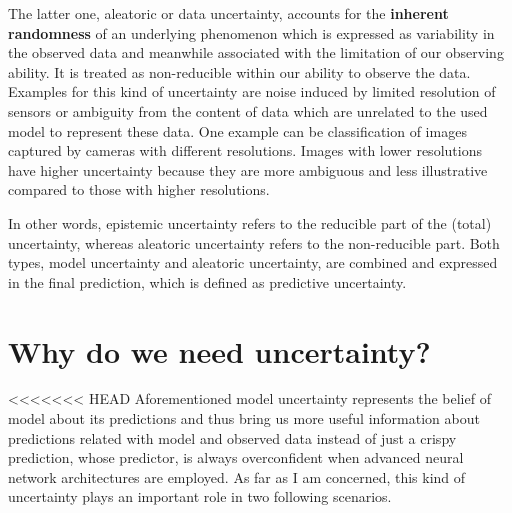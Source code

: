 The latter one, aleatoric or data uncertainty, accounts for the \textbf{inherent randomness} of an underlying phenomenon which is expressed as variability in the observed data and meanwhile associated with the limitation of our observing ability. It is treated as non-reducible within our ability to observe the data. Examples for this kind of uncertainty are noise induced by limited resolution of sensors or ambiguity from the content of data which are unrelated to the used model to represent these data. One example can be classification of images captured by cameras with different resolutions. Images with lower resolutions have higher uncertainty because they are more ambiguous and less illustrative compared to those with higher resolutions. 

In other words, epistemic uncertainty refers to the reducible part of the (total) uncertainty, whereas aleatoric uncertainty refers to the non-reducible part. 
Both types, model uncertainty and aleatoric uncertainty, are combined and expressed in the final prediction, which is defined as predictive uncertainty.

\section{Why do we need uncertainty?}
<<<<<<< HEAD
Aforementioned model uncertainty represents the belief of model about its predictions and thus bring us more useful information about predictions related with model and observed data instead of just a crispy prediction, whose predictor, is always overconfident when advanced neural network architectures are employed\cite{guo2017calibration}. As far as I am concerned, this kind of uncertainty plays an important role in two following scenarios. 


